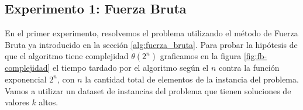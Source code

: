 \documentclass[10pt,a4paper]{article}
\begin{document}
\subsection{Experimento 1: Fuerza Bruta}
En el primer experimento, resolvemos el problema utilizando el método de Fuerza Bruta ya introducido en la sección \ref{alg:fuerza_bruta}. Para probar la hipótesis de que el algoritmo tiene complejidad $\theta(2^{n})$ graficamos en la figura \ref{fig:fb-complejidad} el tiempo tardado por el algoritmo según el $n$ contra la función exponencial $2^{n}$, con $n$ la cantidad total de elementos de la instancia del problema. Vamos a utilizar un dataset de instancias del problema que tienen soluciones de valores $k$ altos.
\newline
\end{document}
